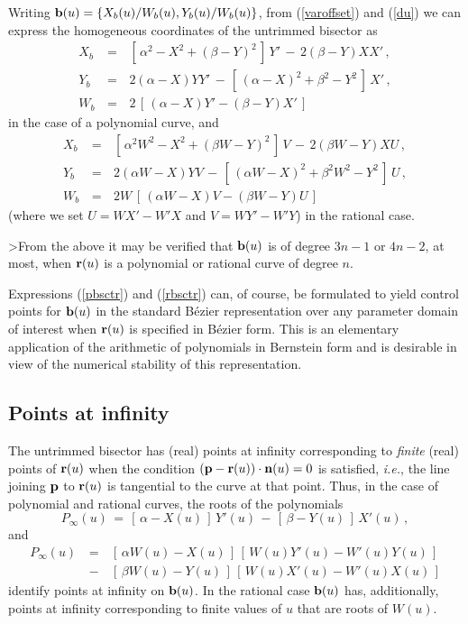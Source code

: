 Writing ${\bf b}(u)=\{X_b(u)/W_b(u),Y_b(u)/W_b(u)\}$, from
(\ref{varoffset}) and (\ref{du}) we can express the homogeneous
coordinates of the untrimmed bisector as
\begin{eqnarray} \label{pbsctr}
X_b &\,=\,& [\,\alpha^2-X^2+(\beta-Y)^2\,]\,Y'
 \,-\, 2(\beta-Y)XX' \,, \nonumber \\
Y_b &\,=\,& 2(\alpha-X)YY'
 \,-\, [\,(\alpha-X)^2+\beta^2-Y^2\,]\,X' \,, \nonumber \\
W_b &\,=\,& 2\,[\,(\alpha-X)Y'-(\beta-Y)X'\,]
\end{eqnarray}
in the case of a polynomial curve, and
\begin{eqnarray} \label{rbsctr}
X_b &\,=\,& [\,\alpha^2W^2-X^2+(\beta W-Y)^2\,]\,V
 \,-\, 2(\beta W-Y)XU \,, \nonumber \\
Y_b &\,=\,& 2(\alpha W-X)YV
 \,-\, [\,(\alpha W-X)^2+\beta^2W^2-Y^2\,]\,U \,, \nonumber \\
W_b &\,=\,& 2W\,[\,(\alpha W-X)V-(\beta W-Y)U\,]
\end{eqnarray}
(where we set $U=WX'-W'X$ and $V=WY'-W'Y$) in the rational case.

\begin{rmk} {\rm
>From the above it may be verified that ${\bf b}(u)$ is of degree
$3n-1$ or $4n-2$, at most, when ${\bf r}(u)$ is a polynomial or
rational curve of degree $n$. }
\end{rmk}

Expressions (\ref{pbsctr}) and (\ref{rbsctr}) can, of course, be
formulated to yield control points for ${\bf b}(u)$ in the standard
B\'ezier representation over any parameter domain of interest when
${\bf r}(u)$ is specified in B\'ezier form. This is an elementary
application of the arithmetic of polynomials in Bernstein form \cite
{farouki88} and is desirable in view of the numerical stability
\cite{farouki87} of this representation.

\subsection{Points at infinity}

The untrimmed bisector has (real) points at infinity corresponding
to {\it finite\/} (real) points of ${\bf r}(u)$ when the condition
$({\bf p}-{\bf r}(u))\cdot{\bf n}(u)=0$ is satisfied, {\it i.e.},
the line joining ${\bf p}$ to ${\bf r}(u)$ is tangential to the
curve at that point. Thus, in the case of polynomial and rational
curves, the roots of the polynomials
\begin{equation} \label{Pinf}
P_\infty(u) \,=\,
[\,\alpha-X(u)\,]\,Y'(u) \,-\, [\,\beta-Y(u)\,]\,X'(u) \,,
\end{equation}
and
\begin{eqnarray} \label{Rinf}
P_\infty(u)
&\,=\,& [\,\alpha W(u)-X(u)\,]\,[\,W(u)Y'(u)-W'(u)Y(u)\,] \nonumber \\
&\,-\,& [\,\beta  W(u)-Y(u)\,]\,[\,W(u)X'(u)-W'(u)X(u)\,]
\end{eqnarray}
identify points at infinity on ${\bf b}(u)$. In the rational case
${\bf b}(u)$ has, additionally, points at infinity corresponding to
finite values of $u$ that are roots of $W(u)$.

